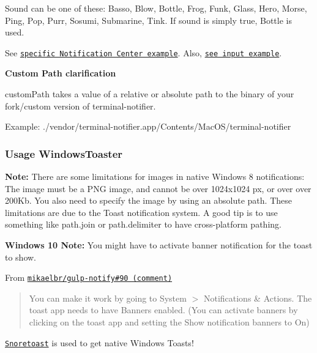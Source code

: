 Sound can be one of these\+: {\ttfamily Basso}, {\ttfamily Blow}, {\ttfamily Bottle}, {\ttfamily Frog}, {\ttfamily Funk}, {\ttfamily Glass}, {\ttfamily Hero}, {\ttfamily Morse}, {\ttfamily Ping}, {\ttfamily Pop}, {\ttfamily Purr}, {\ttfamily Sosumi}, {\ttfamily Submarine}, {\ttfamily Tink}. If sound is simply {\ttfamily true}, {\ttfamily Bottle} is used.

See \href{./example/advanced.js}{\tt specific Notification Center example}. Also, \href{./example/macInput.js}{\tt see input example}.

{\bfseries Custom Path clarification}

{\ttfamily custom\+Path} takes a value of a relative or absolute path to the binary of your fork/custom version of terminal-\/notifier.

Example\+: {\ttfamily ./vendor/terminal-\/notifier.app/\+Contents/\+Mac\+O\+S/terminal-\/notifier}

\subsubsection*{Usage Windows\+Toaster}

{\bfseries Note\+:} There are some limitations for images in native Windows 8 notifications\+: The image must be a P\+NG image, and cannot be over 1024x1024 px, or over over 200\+Kb. You also need to specify the image by using an absolute path. These limitations are due to the Toast notification system. A good tip is to use something like {\ttfamily path.\+join} or {\ttfamily path.\+delimiter} to have cross-\/platform pathing.

{\bfseries Windows 10 Note\+:} You might have to activate banner notification for the toast to show.

From \href{https://github.com/mikaelbr/gulp-notify/issues/90#issuecomment-129333034}{\tt mikaelbr/gulp-\/notify\#90 (comment)} \begin{quote}
You can make it work by going to System $>$ Notifications \& Actions. The \textquotesingle{}toast\textquotesingle{} app needs to have Banners enabled. (You can activate banners by clicking on the \textquotesingle{}toast\textquotesingle{} app and setting the \textquotesingle{}Show notification banners\textquotesingle{} to On) \end{quote}


\href{https://github.com/KDE/snoretoast}{\tt Snoretoast} is used to get native Windows Toasts!


